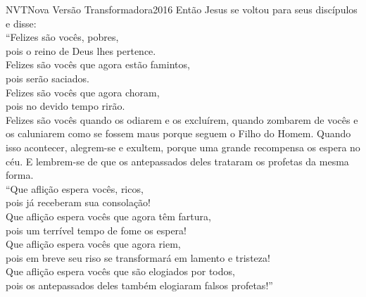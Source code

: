 \begin{traducao}{NVT}{Nova Versão Transformadora}{2016}
Então Jesus se voltou para seus discípulos e disse:\\
“Felizes são vocês, pobres,\\
\quad pois o reino de Deus lhes pertence.\\
Felizes são vocês que agora estão famintos,\\
\quad pois serão saciados.\\
Felizes são vocês que agora choram,\\
\quad pois no devido tempo rirão.\\
Felizes são vocês quando os odiarem e os excluírem, quando zombarem de
vocês e os caluniarem como se fossem maus porque seguem o Filho do Homem.
Quando isso acontecer, alegrem-se e exultem, porque uma grande
recompensa os espera no céu. E lembrem-se de que os antepassados deles
trataram os profetas da mesma forma.\\
“Que aflição espera vocês, ricos,\\
\quad pois já receberam sua consolação!\\
Que aflição espera vocês que agora têm fartura,\\
\quad pois um terrível tempo de fome os espera!\\
Que aflição espera vocês que agora riem,\\
\quad pois em breve seu riso se transformará em lamento e tristeza!\\
Que aflição espera vocês que são elogiados por todos,\\
\quad pois os antepassados deles também elogiaram falsos profetas!”
\end{traducao}

